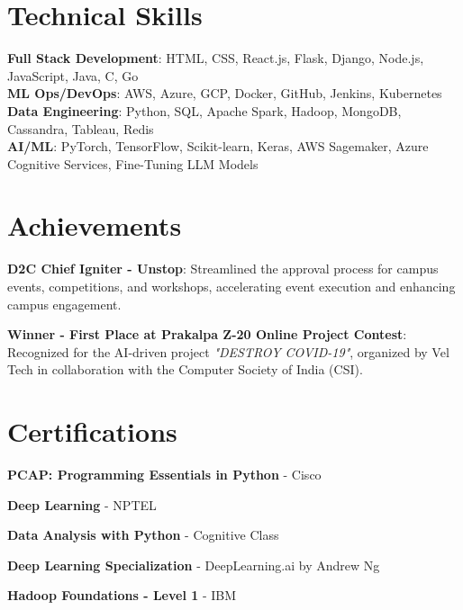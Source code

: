 \documentclass[letterpaper,11pt]{article}
\begin{document}
\section{Technical Skills}
\begin{itemize}[leftmargin=0.15in, label={}]
    \small{\item{
    \textbf{Full Stack Development}{: HTML, CSS, React.js, Flask, Django, Node.js, JavaScript, Java, C, Go} \\
    \textbf{ML Ops/DevOps}{: AWS, Azure, GCP, Docker, GitHub, Jenkins, Kubernetes} \\
    \textbf{Data Engineering}{: Python, SQL, Apache Spark, Hadoop, MongoDB, Cassandra, Tableau, Redis} \\
    \textbf{AI/ML}{: PyTorch, TensorFlow, Scikit-learn, Keras, AWS Sagemaker, Azure Cognitive Services, Fine-Tuning LLM Models} \\
    }}
\end{itemize}
\vspace{-16pt}

\section{Achievements}
\begin{itemize}[leftmargin=0.15in, label={}]
    \small{\item{
        \textbf{D2C Chief Igniter - Unstop}{: Streamlined the approval process for campus events, competitions, and workshops, accelerating event execution and enhancing campus engagement.}
    }}
    \small{\item{
        \textbf{Winner - First Place at Prakalpa Z-20 Online Project Contest}{: Recognized for the AI-driven project \textit{"DESTROY COVID-19"}, organized by Vel Tech in collaboration with the Computer Society of India (CSI).}
    }}
\end{itemize}
\vspace{-10pt}

\section{Certifications}
\begin{itemize}[leftmargin=0.15in, label={}]
    \small{\item{
        \textbf{PCAP: Programming Essentials in Python}{ - Cisco}
    }}
    \small{\item{
        \textbf{Deep Learning}{ - NPTEL}
    }}
    \small{\item{
        \textbf{Data Analysis with Python}{ - Cognitive Class}
    }}
    \small{\item{
        \textbf{Deep Learning Specialization}{ - DeepLearning.ai by Andrew Ng}
    }}
    \small{\item{
        \textbf{Hadoop Foundations - Level 1}{ - IBM}
    }}
\end{itemize}
\vspace{-10pt}
\end{document}
